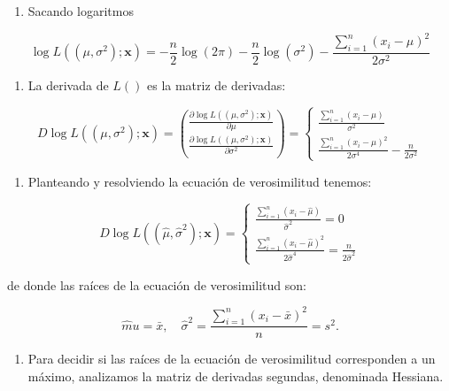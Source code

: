 \documentclass[
]{article}
\providecommand{\tightlist}{%
  \setlength{\itemsep}{0pt}\setlength{\parskip}{0pt}}
\begin{document}
\begin{enumerate}
\def\labelenumi{\arabic{enumi}.}
\setcounter{enumi}{1}
\tightlist
\item
  Sacando logaritmos
\end{enumerate}

\[
\log L\left(\left(\mu, \sigma^{2}\right) ; \mathbf{x}\right)=-\frac{n}{2} \log (2 \pi)-\frac{n}{2} \log \left(\sigma^{2}\right)-\frac{\sum_{i=1}^{n}\left(x_{i}-\mu\right)^{2}}{2 \sigma^{2}}
\]

\begin{enumerate}
\def\labelenumi{\arabic{enumi}.}
\setcounter{enumi}{2}
\tightlist
\item
  La derivada de \(L()\) es la matriz de derivadas:
\end{enumerate}

\[
D \log L\left(\left(\mu, \sigma^{2}\right) ; \mathbf{x}\right)=\binom{\frac{\partial \log L\left(\left(\mu, \sigma^{2}\right) ; \mathbf{x}\right)}{\partial \mu}}{\frac{\partial \log L\left(\left(\mu, \sigma^{2}\right) ; \mathbf{x}\right)}{\partial \sigma^{2}}}=\left\{\begin{array}{c}
\frac{\sum_{i=1}^{n}\left(x_{i}-\mu\right)}{\sigma^{2}} \\
\frac{\sum_{i=1}^{n}\left(x_{i}-\mu\right)^{2}}{2 \sigma^{4}}-\frac{n}{2 \sigma^{2}}
\end{array}\right.
\]

\begin{enumerate}
\def\labelenumi{\arabic{enumi}.}
\setcounter{enumi}{3}
\tightlist
\item
  Planteando y resolviendo la ecuación de verosimilitud tenemos:
\end{enumerate}

\[
D \log L\left(\left(\hat{\mu}, \hat{\sigma}^{2}\right) ; \mathbf{x}\right)=\left\{\begin{array}{c}
\frac{\sum_{i=1}^{n}\left(x_{i}-\hat{\mu}\right)}{\hat{\sigma}^{2}}=0 \\
\frac{\sum_{i=1}^{n}\left(x_{i}-\hat{\mu}\right)^{2}}{2 \hat{\sigma}^{4}}=\frac{n}{2 \hat{\sigma}^{2}}
\end{array}\right.
\]

de donde las raíces de la ecuación de verosimilitud son:

\[
\hat{m} u=\bar{x}, \quad \hat{\sigma}^{2}=\frac{\sum_{i=1}^{n}\left(x_{i}-\bar{x}\right)^{2}}{n}=s^{2} .
\]

\begin{enumerate}
\def\labelenumi{\arabic{enumi}.}
\setcounter{enumi}{4}
\tightlist
\item
  Para decidir si las raíces de la ecuación de verosimilitud corresponden a un máximo, analizamos la matriz de derivadas segundas, denominada Hessiana.
\end{enumerate}
\end{document}
